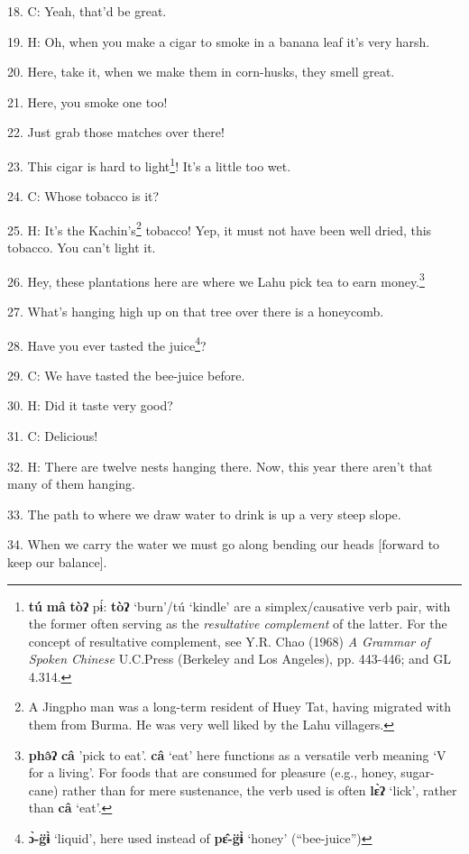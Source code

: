 18. C: Yeah, that'd be great.

19. H: Oh, when you make a cigar to smoke in a banana leaf it's very harsh.

20. Here, take it, when we make them in corn-husks, they smell great.

21. Here, you smoke one too!

22. Just grab those matches over there!

23. This cigar is hard to light\footnote{\textbf{tú} \textbf{mâ} \textbf{tòʔ} pɨ́:\textit{\textbf{ }}\textbf{tòʔ} `burn'/tú `kindle' are a simplex/causative verb pair, with the former often serving as the \textit{resultative complement }of the latter. For the concept of resultative complement, see Y.R. Chao (1968) \textit{A Grammar of Spoken Chinese }U.C.Press (Berkeley and Los Angeles), pp. 443-446; and GL 4.314.}! It's a little too wet.

24. C: Whose tobacco is it?

25. H: It's the Kachin's\footnote{A Jingpho man was a long-term resident of Huey Tat, having migrated with them from Burma. He was very well liked by the Lahu villagers.} tobacco! Yep, it must not have been well dried, this
tobacco. You can't light it.

26. Hey, these plantations here are where we Lahu pick tea to earn money.\footnote{\textbf{phə̂ʔ} \textbf{câ} 'pick to eat'. \textbf{câ} `eat' here functions as a versatile verb meaning `V for a living'. For foods that are consumed for pleasure (e.g., honey, sugar-cane) rather than for mere sustenance, the verb used is often \textbf{lɛ̀ʔ} `lick', rather than \textbf{câ} `eat'.}

27. What's hanging high up on that tree over there is a honeycomb.

28. Have you ever tasted the juice\footnote{\textbf{ɔ̀-g̈ɨ̀} `liquid', here used instead of \textbf{pɛ̂-g̈ɨ̀} `honey' (``bee-juice'')}?

29. C: We have tasted the bee-juice before.

30. H: Did it taste very good?

31. C: Delicious!

32. H: There are twelve nests hanging there. Now, this year there aren't that many
of them hanging.

33. The path to where we draw water to drink is up a very steep slope.

34. When we carry the water we must go along bending our heads [forward to keep
our balance].

